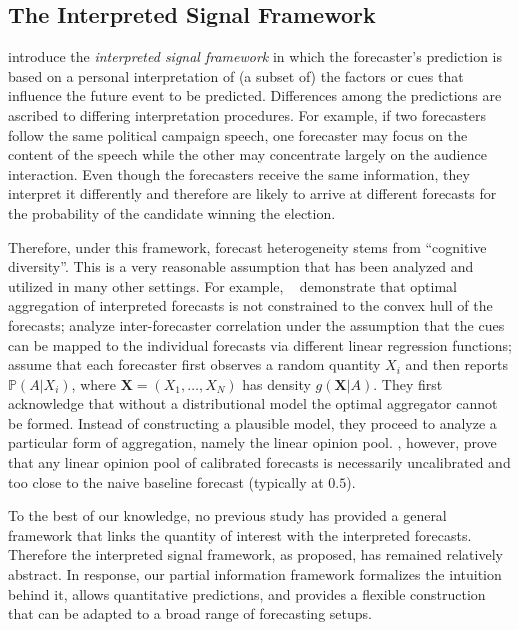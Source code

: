 \documentclass[11pt]{article}
\renewcommand{\P}{\mathbb{P}}
\theoremstyle{definition}
\theoremstyle{definition}
\def\P{{\mathbb P}}
\begin{document}
\subsection{The Interpreted Signal Framework}
\label{ss:inerpreted}

\citet{hong2009interpreted} introduce the {\em interpreted signal
framework} in which the forecaster's prediction is based on a personal
interpretation of (a subset of) the factors or cues that influence the
future event to be predicted.  Differences among the 
predictions are ascribed to differing interpretation procedures.  For
example, if two forecasters follow the same political campaign speech,
one forecaster may focus on the content of the speech while the other may
concentrate largely on the audience interaction.  Even though the
forecasters receive the same information, they interpret it
differently and therefore are likely to arrive at different forecasts for the probability of the candidate winning the election.

Therefore, under this framework, forecast heterogeneity stems from ``cognitive
diversity''.  This is a very reasonable assumption that has been analyzed and
utilized in many other settings.  For example,
~\citet{parunak2013characterizing} demonstrate that optimal
aggregation of interpreted forecasts is not constrained to the
convex hull of the forecasts; \citet{broomell2009experts} analyze
inter-forecaster correlation under the assumption that the cues can be
mapped to the individual forecasts via different linear regression
functions; \cite{degroot1991optimal} assume that each forecaster first observes a random quantity $X_i$ and then reports $\P(A | X_i)$, 
where $\boldsymbol{X} = (X_1, \dots, X_N)$ has density $g(\boldsymbol{X} | A)$. They first acknowledge that without a distributional model the optimal aggregator cannot be formed. Instead of constructing a plausible model, they proceed to analyze a particular form of aggregation, namely the linear opinion pool. \cite{Ranjan08}, however, prove that any linear opinion pool of calibrated forecasts is necessarily uncalibrated and too close to the naive baseline forecast (typically at $0.5$).


To the best of our knowledge, no previous study has provided a general framework that links the quantity of interest with the interpreted forecasts. Therefore the interpreted signal framework, as proposed, has remained relatively abstract. In response, our partial information framework formalizes the intuition behind it, allows quantitative predictions, and provides a flexible construction that can be adapted to a broad range of forecasting setups. 
\end{document}
